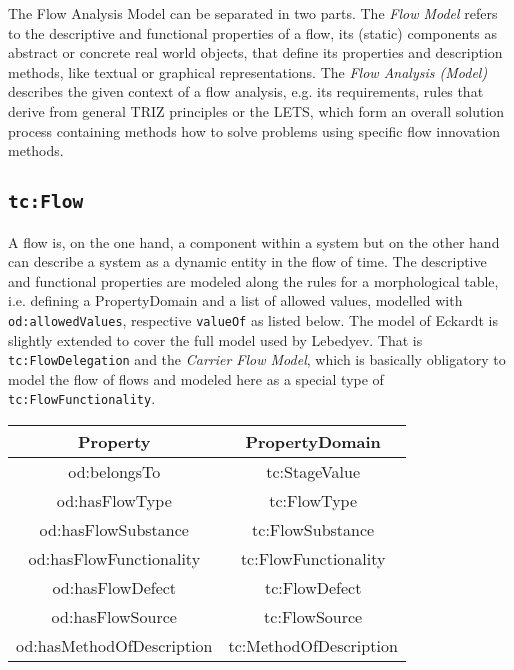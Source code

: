 \documentclass[a4paper,11pt]{article}
\begin{document}
The Flow Analysis Model can be separated in two parts. The \emph{Flow Model}
refers to the descriptive and functional properties of a flow, its (static)
components as abstract or concrete real world objects, that define its
properties and description methods, like textual or graphical representations.
The \emph{Flow Analysis (Model)} describes the given context of a flow
analysis, e.g. its requirements, rules that derive from general TRIZ
principles or the LETS, which form an overall solution process containing
methods how to solve problems using specific flow innovation methods.

\subsection{\texttt{tc:Flow}}

A flow is, on the one hand, a component within a system but on the other hand
can describe a system as a dynamic entity in the flow of time. The descriptive
and functional properties are modeled along the rules for a morphological
table, i.e. defining a PropertyDomain and a list of allowed values, modelled
with \texttt{od:allowedValues}, respective \texttt{valueOf} as listed below.
The model of Eckardt is slightly extended to cover the full model used by
Lebedyev. That is \texttt{tc:FlowDelegation} and the \emph{Carrier Flow Model},
which is basically obligatory to model the flow of flows and modeled here as a
special type of \texttt{tc:FlowFunctionality}.

\begin{center}
\begin{tabular}{|c|c|}\hline
Property & PropertyDomain \\\hline
od:belongsTo & tc:StageValue \\
od:hasFlowType & tc:FlowType  \\
od:hasFlowSubstance & tc:FlowSubstance  \\
od:hasFlowFunctionality & tc:FlowFunctionality  \\
od:hasFlowDefect & tc:FlowDefect  \\
od:hasFlowSource & tc:FlowSource  \\
od:hasMethodOfDescription & tc:MethodOfDescription \\\hline 
\end{tabular}
\end{center}
\end{document}
